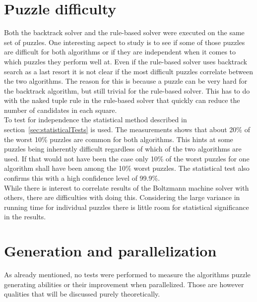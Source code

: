 \documentclass[a4paper,11pt]{kth-mag}
\begin{document}
\FloatBarrier
\section{Puzzle difficulty}
\label{sec:difficultyAnalysis}
Both the backtrack solver and the rule-based solver were executed on the same set of puzzles.
One interesting aspect to study is to see if some of those puzzles are difficult for both algorithms or if they are independent when it comes to which puzzles they perform well at.
Even if the rule-based solver uses backtrack search as a last resort it is not clear if the most difficult puzzles correlate between the two algorithms.
The reason for this is because a puzzle can be very hard for the backtrack algorithm, but still trivial for the rule-based solver. 
This has to do with the naked tuple rule in the rule-based solver that quickly can reduce the number of candidates in each square.
\\
To test for independence the statistical method described in section~\ref{sec:statisticalTests} is used.
The measurements shows that about 20\% of the worst 10\% puzzles are common for both algorithms. 
This hints at some puzzles being inherently difficult regardless of which of the two algorithms are used.
If that would not have been the case only 10\% of the worst puzzles for one algorithm shall have been among the 10\% worst puzzles.
The statistical test also confirms this with a high confidence level of 99.9\%.
\\
While there is interest to correlate results of the Boltzmann machine solver with others, there are difficulties with doing this.
Considering the large variance in running time for individual puzzles there is little room for statistical significance in the results.

\section{Generation and parallelization}
\label{sec:generation}
As already mentioned, no tests were performed to measure the algorithms puzzle generating abilities or their improvement when parallelized.
Those are however qualities that will be discussed purely theoretically.
\end{document}
